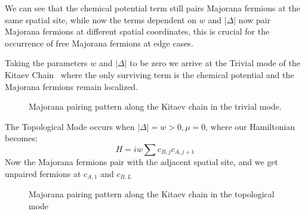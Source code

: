\documentclass[11pt, a4paper]{article}
\numberwithin{equation}{section}
\begin{document}
We can see that the chemical potential term still pairs Majorana fermions at the same spatial site, while now the terms dependent on $w$ and $|\Delta|$ now
pair Majorana fermions at different spatial coordinates, this is crucial for the occurrence of free Majorana fermions at edge cases.

Taking the parameters $w$ and $|\Delta|$ to be zero we arrive at the Trivial mode of the Kitaev Chain~\cite{Kitaev2000} where the only surviving term
is the chemical potential and the Majorana fermions remain localized.

\begin{figure}[h]
\centering
{}
\caption{\small Majorana pairing pattern along the Kitaev chain in the trivial mode.}
\label{fig:kitaev-chain-trivial}
\end{figure}

The Topological Mode occurs when $|\Delta| = w > 0, \mu = 0$, where our Hamiltonian becomes:
\begin{equation}
    H = iw \sum c_{B,j}c_{A,j+1}
    \label{eq:kitaev_Hamiltonian_topological}
\end{equation}
Now the Majorana fermions pair with the adjacent spatial site, and we get unpaired fermions at $c_{A,1}$ and $c_{B,L}$

\begin{figure}[h]
\centering
{}
\caption{\small Majorana pairing pattern along the Kitaev chain in the topological mode}
\label{fig:kitaev-chain-topological}
\end{figure}

\end{document}
